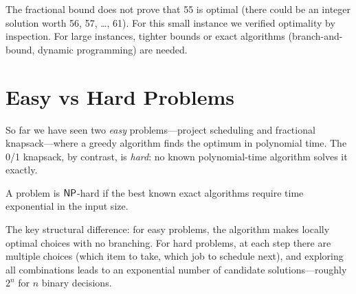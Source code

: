 \begin{remark}
The fractional bound does not prove that 55 is optimal
(there could be an integer solution worth 56, 57, \ldots, 61).
For this small instance we verified optimality by inspection.
For large instances, tighter bounds or exact algorithms
(branch-and-bound, dynamic programming) are needed.
\end{remark}


\section{Easy vs Hard Problems}
\label{sec:easy-hard}

So far we have seen two \emph{easy} problems---project scheduling
and fractional knapsack---where a greedy algorithm finds the
optimum in polynomial time.  The 0/1 knapsack, by contrast,
is \emph{hard}: no known polynomial-time algorithm solves it
exactly.

\begin{definition}
\label{def:np-hard-informal}
A problem is $\mathsf{NP}$-hard if the best known exact algorithms
require time exponential in the input size.%
\end{definition}

The key structural difference: for easy problems, the algorithm
makes locally optimal choices with no branching.  For hard
problems, at each step there are multiple choices (which item
to take, which job to schedule next), and exploring all
combinations leads to an exponential number of candidate
solutions---roughly $2^n$ for $n$ binary decisions.

